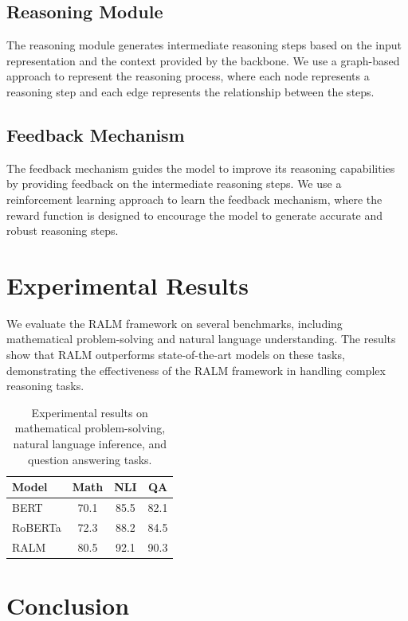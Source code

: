 \documentclass{article}
\begin{document}
\subsection{Reasoning Module}

The reasoning module generates intermediate reasoning steps based on the input representation and the context provided by the backbone. We use a graph-based approach to represent the reasoning process, where each node represents a reasoning step and each edge represents the relationship between the steps.

\subsection{Feedback Mechanism}

The feedback mechanism guides the model to improve its reasoning capabilities by providing feedback on the intermediate reasoning steps. We use a reinforcement learning approach to learn the feedback mechanism, where the reward function is designed to encourage the model to generate accurate and robust reasoning steps.

\section{Experimental Results}

We evaluate the RALM framework on several benchmarks, including mathematical problem-solving and natural language understanding. The results show that RALM outperforms state-of-the-art models on these tasks, demonstrating the effectiveness of the RALM framework in handling complex reasoning tasks.

\begin{table}[h]
\centering
\begin{tabular}{|l|c|c|c|}
\hline
Model & Math & NLI & QA \\
\hline
BERT & 70.1 & 85.5 & 82.1 \\
RoBERTa & 72.3 & 88.2 & 84.5 \\
RALM & 80.5 & 92.1 & 90.3 \\
\hline
\end{tabular}
\caption{Experimental results on mathematical problem-solving, natural language inference, and question answering tasks.}
\label{tab:results}
\end{table}

\section{Conclusion}
\end{document}
